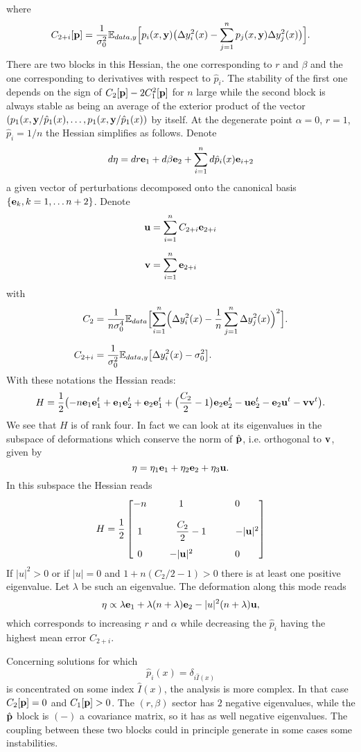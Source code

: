 where
\[
C_{2+i}[{\bf p}] = \frac{1}{\sigma_0^2}{\mathbb E}_{data,y}
\Bigl[ p_i(x,{\bf y})\bigl(\Delta y_i^2(x)-\sum_{j=1}^np_j(x,{\bf y})\Delta y_j^2(x)\bigr)\Bigr].
\]
There are two blocks in this Hessian, the one corresponding to $r$ and $\beta$ and the one corresponding to derivatives with respect to $\hat p_i$.
The stability of the first one depends on the sign of $C_2[{\bf p}]-2C_1^2[{\bf p}]$ for $n$ large while the second block
is always stable as being an average of the exterior product of the vector $(p_1(x,{\bf y}/\hat p_1(x),\ldots,p_1(x,{\bf y}/\hat p_1(x))$
by itself. At the degenerate point $\alpha=0$, $r=1$, $\hat  p_i=1/n$ the Hessian simplifies as follows. Denote
\[
{d{\bf \eta}} = dr{\bf e}_1+d\beta{\bf e}_2+\sum_{i=1}^n d\hat p_i(x){\bf e}_{i+2}
\]
a given vector of perturbations decomposed onto the canonical basis $\{{\bf e}_k,k=1,\ldots n+2\}$.
Denote
\begin{align*}
{\bf u} &= \sum_{i=1}^n C_{2+i} {\bf e}_{2+i}\\[0.2cm]    
{\bf v} &= \sum_{i=1}^n  {\bf e}_{2+i}
\end{align*}
with
\begin{align*}
C_2 &= \frac{1}{n\sigma_0^4}{\mathbb E}_{data}\Bigl[\sum_{i=1}^n \Bigl(\Delta y_i^2(x)-\frac{1}{n}\sum_{j=1}^n\Delta y_j^2(x)\Bigr)^2\Bigr].\\[0.2cm]
C_{2+i} &= \frac{1}{\sigma_0^2}{\mathbb E}_{data,y}
\bigl[\Delta y_i^2(x)-\sigma_0^2\bigr].
\end{align*}
With these notations the Hessian reads: 
\[
H = \frac{1}{2}\bigl(-n{\bf e}_1{\bf e}_1^t+{\bf e}_1{\bf e}_2^t+{\bf e}_2{\bf e}_1^t+\bigl(\frac{C_2}{2}-1\bigr){\bf e}_2{\bf e}_2^t
-{\bf u}{\bf e}_2^t-{\bf e}_2{\bf u}^t-{\bf v}{\bf v}^t\bigr).
\]
We see that $H$ is of rank four. In fact we can look at its eigenvalues in the subspace of deformations
which conserve the norm of $\hat {\bf p}$, i.e. orthogonal to ${\bf v}$, given by
\[
{\bf \eta} = \eta_1{\bf e}_1+\eta_2{\bf e}_2+\eta_3{\bf u}.
\]
In this subspace the Hessian reads
\[
H =\frac{1}{2}
\left[
  \begin{matrix}
 -n & 1 &0 \\[0.4cm] 
 1 & \qquad\displaystyle \frac{C_2}{2}-1&\qquad-\vert {\bf u}\vert^2  \\[0.4cm]
 0& -\vert {\bf u}\vert^2 &0 
  \end{matrix}
  \right]
\]
If $|u|^2>0$ or  if $|u|=0$ and $1+n(C_2/2-1)>0$ there is at least one positive eigenvalue. Let $\lambda$ be such an eigenvalue.
The deformation along this mode reads
\[
{\bf \eta} \propto \lambda{\bf e}_1+\lambda(n+\lambda){\bf e}_2-|u|^2(n+\lambda){\bf u},
\]
which corresponds to increasing $r$ and $\alpha$ while decreasing the $\hat p_i$ having the highest mean error $C_{2+i}$.

\noindent Concerning solutions for which
\[
\hat p_i(x) = \delta_{i\hat I(x)}
\]
is concentrated on some index $\hat I(x)$,  the analysis is more complex. In that case $C_2[{\bf p}]=0$ and $C_1[{\bf p}] >0$. The $(r,\beta)$ sector has $2$ negative eigenvalues, while the $\hat {\bf p}$ block is $(-)$ a covariance matrix, so it has as well negative eigenvalues. The coupling between these  two blocks could in principle generate in some cases some instabilities.


